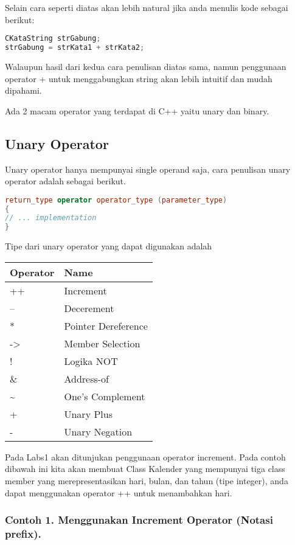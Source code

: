 Selain cara seperti diatas akan lebih natural jika anda menulis kode
sebagai berikut:

\begin{lstlisting}[language=c++]
CKataString strGabung;
strGabung = strKata1 + strKata2;
\end{lstlisting}

Walaupun hasil dari kedua cara penulisan diatas sama, namun penggunaan
operator + untuk menggabungkan string akan lebih intuitif dan mudah
dipahami.

Ada 2 macam operator yang terdapat di C++ yaitu unary dan binary.

\subsection{Unary Operator}\label{unary-operator}

Unary operator hanya mempunyai single operand saja, cara penulisan unary
operator adalah sebagai berikut.

\begin{lstlisting}[language=c++]
return_type operator operator_type (parameter_type)
{
// ... implementation
}
\end{lstlisting}

Tipe dari unary operator yang dapat digunakan adalah

\begin{longtable}[]{@{}ll@{}}
\toprule
Operator & Name\tabularnewline
\midrule
\endhead
++ & Increment\tabularnewline
-- & Decerement\tabularnewline
* & Pointer Dereference\tabularnewline
-\textgreater{} & Member Selection\tabularnewline
! & Logika NOT\tabularnewline
\& & Address-of\tabularnewline
\textasciitilde{} & One's Complement\tabularnewline
+ & Unary Plus\tabularnewline
- & Unary Negation\tabularnewline
\bottomrule
\end{longtable}

Pada Labs1 akan ditunjukan penggunaan operator increment. Pada contoh
dibawah ini kita akan membuat Class Kalender yang mempunyai tiga class
member yang merepresentasikan hari, bulan, dan tahun (tipe integer),
anda dapat menggunakan operator ++ untuk menambahkan hari.

\subsubsection*{Contoh 1. Menggunakan Increment Operator (Notasi prefix).}

